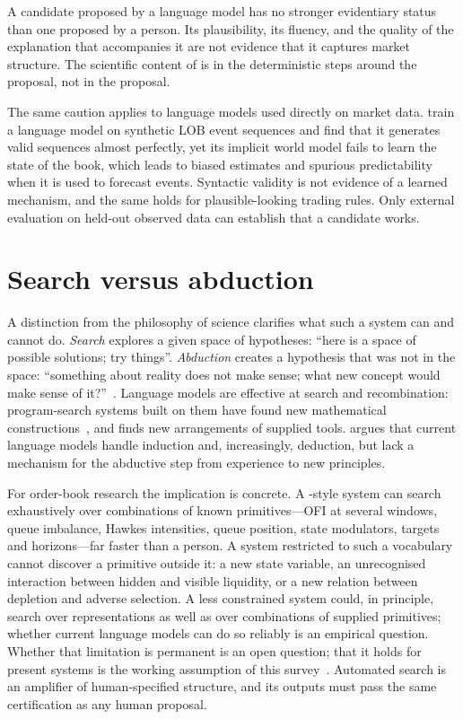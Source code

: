 A candidate proposed by a language model has no stronger evidentiary status than one proposed by a
person. Its plausibility, its fluency, and the quality of the explanation that accompanies it are
not evidence that it captures market structure. The scientific content of \lamd{} is in the
deterministic steps around the proposal, not in the proposal.

The same caution applies to language models used directly on market data.
\citet{llmlob2026} train a language model on synthetic LOB event sequences and find that it
generates valid sequences almost perfectly, yet its implicit world model fails to learn the state
of the book, which leads to biased estimates and spurious predictability when it is used to
forecast events. Syntactic validity is not evidence of a learned mechanism, and the same holds for
plausible-looking trading rules. Only external evaluation on held-out observed data can establish that a
candidate works.

\section{Search versus abduction}
\label{sec:abduction}

A distinction from the philosophy of science clarifies what such a system can and cannot do.
\emph{Search} explores a given space of hypotheses: ``here is a space of possible solutions; try
things''. \emph{Abduction} creates a hypothesis that was not in the space: ``something about reality
does not make sense; what new concept would make sense of it?''~\citep{mayeski2026abduction}. Language
models are effective at search and recombination: program-search systems built on them have found new
mathematical constructions~\citep{romera2024}, and \lamd{} finds new arrangements of supplied tools.
\citet{zahavy2026} argues that current language models handle induction and, increasingly,
deduction, but lack a mechanism for the abductive step from experience to new principles.

For order-book research the implication is concrete. A \lamd{}-style system can search exhaustively
over combinations of known primitives---OFI at several windows, queue imbalance, Hawkes intensities,
queue position, state modulators, targets and horizons---far faster than a person. A system restricted
to such a vocabulary cannot discover a primitive outside it: a new state variable, an unrecognised
interaction between hidden and visible liquidity, or a new relation between depletion and adverse
selection. A less constrained system could, in principle, search over representations as well as over
combinations of supplied primitives; whether current language models can do so reliably is an empirical
question. Whether that limitation is permanent is an open question; that it holds for present systems
is the working assumption of this survey~\citep{mayeski2026agent}. Automated search is an amplifier of
human-specified structure, and its outputs must pass the same certification as any human proposal.

